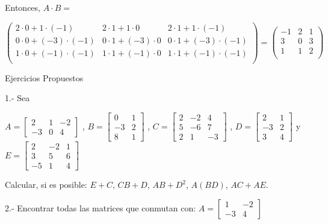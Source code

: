 Entonces, $A \cdot B=$

$\left(
\begin{array}{ccc}
2\cdot 0 + 1\cdot (-1)       &   2\cdot 1+ 1\cdot 0        & 2\cdot 1 + 1\cdot (-1)     \\
0\cdot 0 + (-3)\cdot (-1)   &   0\cdot 1+ (-3)\cdot 0    & 0\cdot 1 + (-3)\cdot (-1)  \\
1\cdot 0 + (-1)\cdot (-1)   &   1\cdot 1+ (-1)\cdot 0    & 1\cdot 1 + (-1)\cdot (-1)  \\
\end{array}
\right)
=
\left(
\begin{array}{ccc}
-1       &   2        & 1     \\
3       &   0        & 3     \\
1        &   1         & 2    \\
\end{array}
\right)
$


{Ejercicios Propuestos}

1.- Sea 

 $ A= \begin{bmatrix}
2 &  1 & -2 \\
-3 &  0 &  4
\end{bmatrix}$
, 
 $ B= \begin{bmatrix}
 0 &   1\\
-3 &  2  \\
 8 &  1
\end{bmatrix}$
, 
 $ C= \begin{bmatrix}
2   &  -2   & 4   \\
5   &  -6  &  7\\
2   &   1   & -3
\end{bmatrix}$
,
$ D= \begin{bmatrix}
2 &   1\\
-3 &  2  \\
 3  &  4
\end{bmatrix}$
y 
$ E= \begin{bmatrix}
2   &  -2   & 1   \\
3   &  5    &  6\\
-5  &   1   & 4
\end{bmatrix}$

Calcular, si es posible:  
$E+C$, $CB+D$, $AB+D^2$, $A(BD)$, $AC+AE$.


2.- Encontrar todas las matrices que conmutan con:
$ A= \begin{bmatrix}
1 & -2\\
-3 & 4
\end{bmatrix}$

